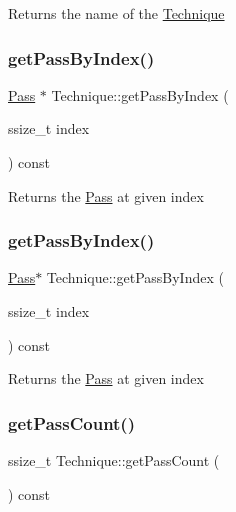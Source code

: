 Returns the name of the \hyperlink{classTechnique}{Technique} \mbox{\label{classTechnique_ada593b093eaf1e0b964f96789d412eec}} 
\subsubsection{\texorpdfstring{get\+Pass\+By\+Index()}{getPassByIndex()}\hspace{0.1cm}{\footnotesize\ttfamily [1/2]}}
{\footnotesize\ttfamily \hyperlink{classPass}{Pass} $\ast$ Technique\+::get\+Pass\+By\+Index (\begin{DoxyParamCaption}\item[{ssize\+\_\+t}]{index }\end{DoxyParamCaption}) const}

Returns the \hyperlink{classPass}{Pass} at given index \mbox{\label{classTechnique_ab0b77a4dd6ba08b17c84aa089a556e0e}} 
\subsubsection{\texorpdfstring{get\+Pass\+By\+Index()}{getPassByIndex()}\hspace{0.1cm}{\footnotesize\ttfamily [2/2]}}
{\footnotesize\ttfamily \hyperlink{classPass}{Pass}$\ast$ Technique\+::get\+Pass\+By\+Index (\begin{DoxyParamCaption}\item[{ssize\+\_\+t}]{index }\end{DoxyParamCaption}) const}

Returns the \hyperlink{classPass}{Pass} at given index \mbox{\label{classTechnique_a6de439117a58b51d44729dafd25c9a2a}} 
\subsubsection{\texorpdfstring{get\+Pass\+Count()}{getPassCount()}\hspace{0.1cm}{\footnotesize\ttfamily [1/2]}}
{\footnotesize\ttfamily ssize\+\_\+t Technique\+::get\+Pass\+Count (\begin{DoxyParamCaption}{ }\end{DoxyParamCaption}) const}

